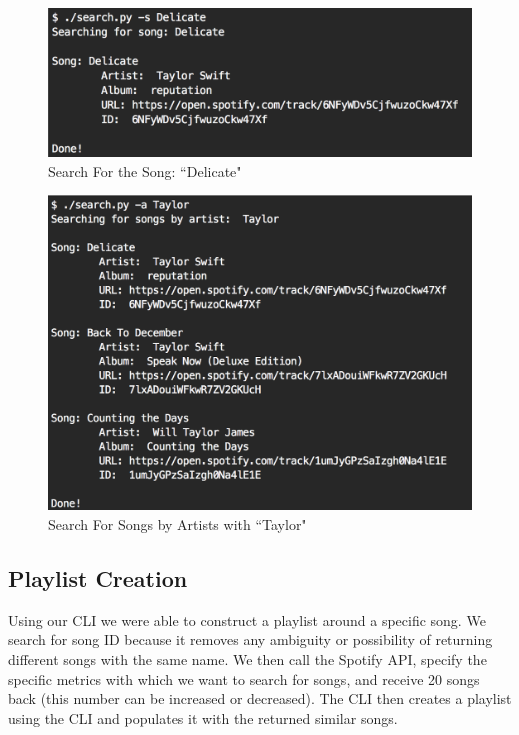 \documentclass [letter,12pt] {article}
\begin{document}
        \begin{figure}[htp]
            \centering
            \includegraphics[width=\textwidth]{Delicate_Song_Search.png}
            \caption{Search For the Song: ``Delicate"}
            \label{fig:delicatesong}
        \end{figure}
        
        \begin{figure}[htp]
            \centering
            \includegraphics[width=\textwidth]{Artist_Taylor_Search.png}
            \caption{Search For Songs by Artists with ``Taylor"}
            \label{fig:taylorartist}
        \end{figure}
\newpage
    \subsection{Playlist Creation}
        Using our CLI we were able to construct a playlist around a specific song. We search for song ID because it removes any ambiguity or possibility of returning different songs with the same name. We then call the Spotify API, specify the specific metrics with which we want to search for songs, and receive 20 songs back (this number can be increased or decreased). The CLI then creates a playlist using the CLI and populates it with the returned similar songs.
        
\end{document}
